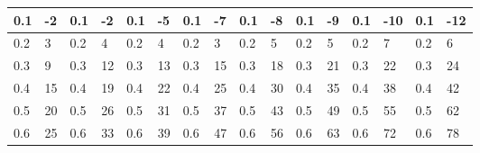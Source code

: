 \documentclass[12pt, a4paper]{article}
\begin{document}
\begin{table}[H]
\begin{tabular}{|ll|ll|ll|ll|ll|ll|ll|ll|}
    \multicolumn{1}{|l|}{0.1}  & -2                         & \multicolumn{1}{l|}{0.1}  & -2                         & \multicolumn{1}{l|}{0.1}  & -5                         & \multicolumn{1}{l|}{0.1}  & -7                         & \multicolumn{1}{l|}{0.1}  & -8                         & \multicolumn{1}{l|}{0.1}  & -9                         & \multicolumn{1}{l|}{0.1}  & -10                        & \multicolumn{1}{l|}{0.1}  & -12                        \\ \hline
    \multicolumn{1}{|l|}{0.2}  & 3                          & \multicolumn{1}{l|}{0.2}  & 4                          & \multicolumn{1}{l|}{0.2}  & 4                          & \multicolumn{1}{l|}{0.2}  & 3                          & \multicolumn{1}{l|}{0.2}  & 5                          & \multicolumn{1}{l|}{0.2}  & 5                          & \multicolumn{1}{l|}{0.2}  & 7                          & \multicolumn{1}{l|}{0.2}  & 6                          \\ \hline
    \multicolumn{1}{|l|}{0.3}  & 9                          & \multicolumn{1}{l|}{0.3}  & 12                         & \multicolumn{1}{l|}{0.3}  & 13                         & \multicolumn{1}{l|}{0.3}  & 15                         & \multicolumn{1}{l|}{0.3}  & 18                         & \multicolumn{1}{l|}{0.3}  & 21                         & \multicolumn{1}{l|}{0.3}  & 22                         & \multicolumn{1}{l|}{0.3}  & 24                         \\ \hline
    \multicolumn{1}{|l|}{0.4}  & 15                         & \multicolumn{1}{l|}{0.4}  & 19                         & \multicolumn{1}{l|}{0.4}  & 22                         & \multicolumn{1}{l|}{0.4}  & 25                         & \multicolumn{1}{l|}{0.4}  & 30                         & \multicolumn{1}{l|}{0.4}  & 35                         & \multicolumn{1}{l|}{0.4}  & 38                         & \multicolumn{1}{l|}{0.4}  & 42                         \\ \hline
    \multicolumn{1}{|l|}{0.5}  & 20                         & \multicolumn{1}{l|}{0.5}  & 26                         & \multicolumn{1}{l|}{0.5}  & 31                         & \multicolumn{1}{l|}{0.5}  & 37                         & \multicolumn{1}{l|}{0.5}  & 43                         & \multicolumn{1}{l|}{0.5}  & 49                         & \multicolumn{1}{l|}{0.5}  & 55                         & \multicolumn{1}{l|}{0.5}  & 62                         \\ \hline
    \multicolumn{1}{|l|}{0.6}  & 25                         & \multicolumn{1}{l|}{0.6}  & 33                         & \multicolumn{1}{l|}{0.6}  & 39                         & \multicolumn{1}{l|}{0.6}  & 47                         & \multicolumn{1}{l|}{0.6}  & 56                         & \multicolumn{1}{l|}{0.6}  & 63                         & \multicolumn{1}{l|}{0.6}  & 72                         & \multicolumn{1}{l|}{0.6}  & 78                         \\ \hline

\end{tabular}
\end{table}
\end{document}
